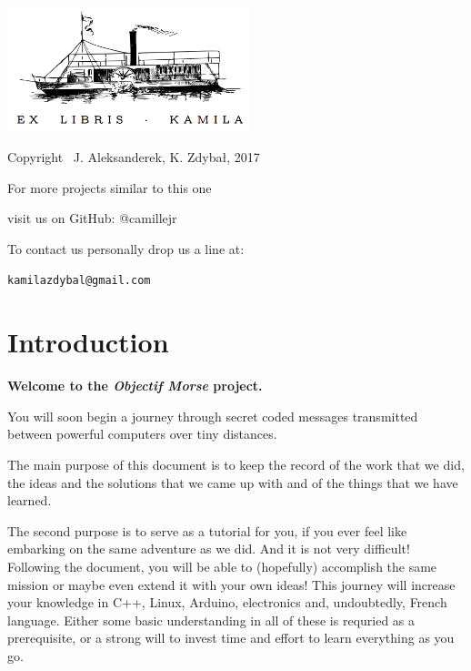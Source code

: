 \documentclass[12pt]{report}
\begin{document}
\thispagestyle{empty}
\begin{center}
    
\vspace*{4cm}

\includegraphics[width = 70mm]{ex_libris.png}

\vspace*{2cm}

Copyright \textcopyright \, J. Aleksanderek, K. Zdybał, 2017

For more projects similar to this one

visit us on GitHub: @camillejr

To contact us personally drop us a line at:

\verb|kamilazdybal@gmail.com|

\end{center}
\newpage




\setlength{\parindent}{0cm}
\clearpage

\tableofcontents

\setlength{\parskip}{1em}
\renewcommand{\baselinestretch}{1.0}

\chapter{Introduction}\label{chap:intro}

\textbf{Welcome to the \textit{Objectif Morse} project.} 

You will soon begin a journey through secret coded messages transmitted between powerful computers over tiny distances.

The main purpose of this document is to keep the record of the work that we did, the ideas and the solutions that we came up with and of the things that we have learned.

The second purpose is to serve as a tutorial for you, if you ever feel like embarking on the same adventure as we did. And it is not very difficult! Following the document, you will be able to (hopefully) accomplish the same mission or maybe even extend it with your own ideas! This journey will increase your knowledge in C++, Linux, Arduino, electronics and, undoubtedly, French language. Either some basic understanding in all of these is requried as a prerequisite, or a strong will to invest time and effort to learn everything as you go.
\end{document}
